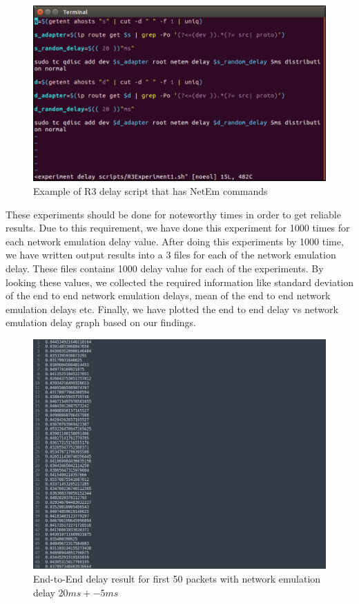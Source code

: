 \documentclass[conference]{IEEEtran}
\begin{document}
\begin{figure}[h]
    \centering
    \includegraphics[scale=0.12]{Netem2.png}
    \caption{Example of R3 delay script that has NetEm commands}
\end{figure}

These experiments should be done for noteworthy times in order to get reliable results. Due to this requirement, we have done this experiment for 1000 times for each network emulation delay value. After doing this experiments by 1000 time, we have written output results into a 3 files for each of the network emulation delay. These files contains 1000 delay value for each of the experiments. By looking these values, we collected the required information like standard deviation of the end to end network emulation delays, mean of the end to end network emulation delays etc. Finally, we have plotted the end to end delay vs network emulation delay graph based on our findings. 

\begin{figure}
    \centering
    \includegraphics[scale=0.12]{20msresults.png}
    \caption{End-to-End delay result for first 50 packets with network emulation delay $20ms +- 5ms $}
\end{figure}
\end{document}
